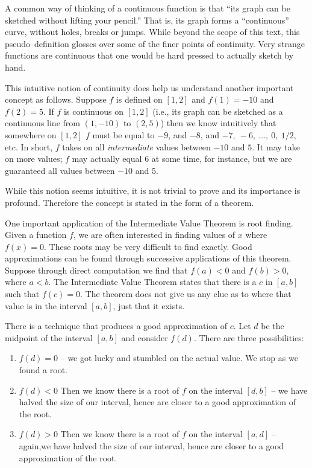 A common way of thinking of a continuous function is that ``its graph can be sketched without lifting your pencil.'' That is, its graph forms a ``continuous'' curve, without holes, breaks or jumps. 
While beyond the scope of this text, this pseudo--definition glosses over some of the finer points of continuity. Very strange functions are continuous that one would be hard pressed to actually sketch by hand. 

This intuitive notion of continuity does help us understand another important concept as follows. Suppose $f$ is defined on $[1,2]$ and $f(1) = -10$ and $f(2) = 5$. If $f$ is continuous on $[1,2]$ (i.e., its graph can be sketched as a continuous line from $(1,-10)$ to $(2,5)$) then we know intuitively that somewhere on $[1,2]$ $f$ must be equal to $-9$, and $-8$, and $-7,\ -6,\ \ldots,\ 0,\ 1/2,$ etc. In short, $f$ takes on all \textit{intermediate} values between $-10$ and $5$. It may take on more values; $f$ may actually equal 6 at some time, for instance, but we are guaranteed all values between $-10$ and 5. 

While this notion seems intuitive, it is not trivial to prove and its importance is profound. Therefore the concept is stated in the form of a theorem.


One important application of the Intermediate Value Theorem is root finding. Given a function $f$, we are often interested in finding values of $x$ where $f(x) = 0$. These roots may be very difficult to find exactly. Good approximations can be found through successive applications of this theorem. Suppose through direct computation we find that $f(a) <0 $ and $f(b)>0$, where $a<b$. The Intermediate Value Theorem states that there is a $c$ in $[a,b]$ such that $f(c) = 0$. The theorem does not give us any clue as to where that value is in the interval $[a,b]$, just that it exists. 

There is a technique that produces a good approximation of $c$. Let $d$ be the midpoint of the interval $[a,b]$ and consider $f(d)$. There are three possibilities:
	\begin{enumerate} 
	\item		$f(d) = 0$ -- we got lucky and stumbled on the actual value. We stop as we found a root.
	\item		$f(d) <0$ Then we know there is a root of $f$ on the interval $[d,b]$ -- we have halved the size of our interval, hence are closer to a good approximation of the root.
	\item		$f(d) >0$ Then we know there is a root of $f$ on the interval $[a,d]$ -- again,we have halved the size of our interval, hence are closer to a good approximation of the root.
	\end{enumerate}

